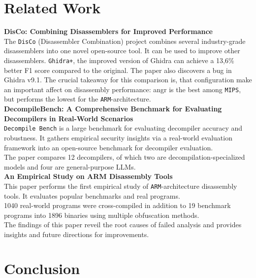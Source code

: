 \documentclass[seminar]{plai}
\begin{document}
\section{Related Work}
\label{sec:related-work}
\textbf{DisCo: Combining Disassemblers for Improved Performance}\\
The \texttt{DisCo} (Disassembler Combination) project combines several industry-grade disassemblers into one novel open-source tool. It can be used to improve other disassemblers. \texttt{Ghidra+}, the improved version of Ghidra can achieve a 13,6\% better F1 score compared to the original. The paper also discovers a bug in Ghidra v9.1. The crucial takeaway for this comparison is, that configuration make an important affect on disassembly performance: angr is the best among \texttt{MIPS}, but performs the lowest for the \texttt{ARM}-architecture.\cite{DisCo-combining-disassemblers-for-improved-performance}\\

\noindent\textbf{DecompileBench: A Comprehensive Benchmark for Evaluating Decompilers in Real-World Scenarios}\\
\texttt{Decompile Bench} is a large benchmark for evaluating decompiler accuracy and robustness. It gathers empirical security insights via a real-world evaluation framework into an open-source benchmark for decompiler evaluation.\\
The paper compares 12 decompilers, of which two are decompilation-specialized models and four are general-purpose LLMs.\cite{decompileBench-comprehensice-benchmark-for-evaluating-decompilers-in-real-world-scenarios}\\

\noindent\textbf{An Empirical Study on ARM Disassembly Tools}\\
This paper performs the first empirical study of \texttt{ARM}-architecture disassembly tools. It evaluates popular benchmarks and real programs.\\
1040 real-world programs were cross-compiled in addition to 19 benchmark programs into 1896 binaries using multiple obfuscation methods.\\
The findings of this paper reveil the root causes of failed analysis and provides insights and future directions for improvements.\cite{an-empirical-study-on-ARM-disassembly-disassembly-tools} 

\section{Conclusion}
\label{sec:conclusion}




\end{document}
